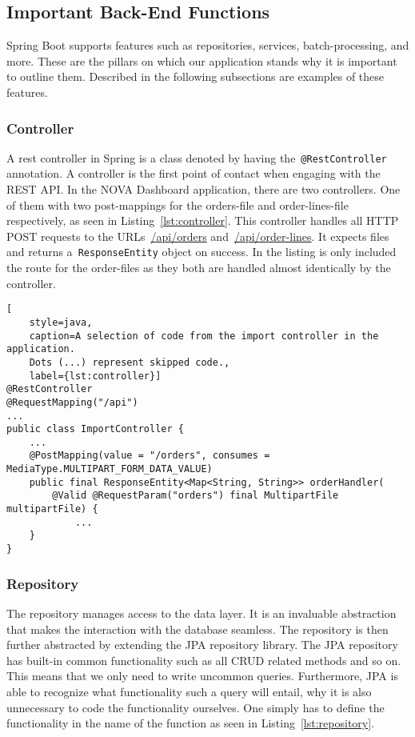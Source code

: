 \subsection{Important Back-End Functions}\label{subsec:important-back-end-functions}

Spring Boot supports features such as repositories, services, batch-processing, and more.
These are the pillars on which our application stands why it is important to outline them.
Described in the following subsections are examples of these features.

\subsubsection{Controller}

A rest controller in Spring is a class denoted by having the~\texttt{@RestController} annotation.
A controller is the first point of contact when engaging with the REST API\@.
In the NOVA Dashboard application, there are two controllers.
One of them with two post-mappings for the orders-file and order-lines-file respectively, as seen in
Listing~\ref{lst:controller}.
This controller handles all HTTP POST requests to the URLs~\url{/api/orders} and~\url{/api/order-lines}.
It expects files and returns a~\texttt{ResponseEntity} object on success.
In the listing is only included the route for the order-files as they both are handled almost identically by the
controller.

\begin{lstlisting}[
    style=java,
    caption=A selection of code from the import controller in the application.
    Dots (...) represent skipped code.,
    label={lst:controller}]
@RestController
@RequestMapping("/api")
...
public class ImportController {
    ...
    @PostMapping(value = "/orders", consumes = MediaType.MULTIPART_FORM_DATA_VALUE)
    public final ResponseEntity<Map<String, String>> orderHandler(
        @Valid @RequestParam("orders") final MultipartFile multipartFile) {
            ...
    }
}
\end{lstlisting}

\subsubsection{Repository}

The repository manages access to the data layer.
It is an invaluable abstraction that makes the interaction with the database seamless.
The repository is then further abstracted by extending the JPA repository library.
The JPA repository has built-in common functionality such as all CRUD related methods and so on.
This means that we only need to write uncommon queries.
Furthermore, JPA is able to recognize what functionality such a query will entail,
why it is also unnecessary to code the functionality ourselves.
One simply has to define the functionality in the name of the function as seen in Listing~\ref{lst:repository}.

